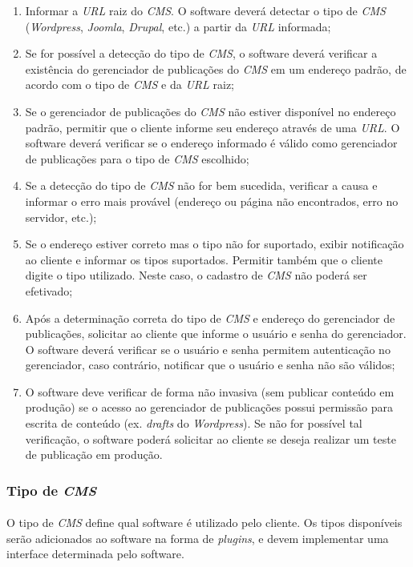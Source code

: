 \documentclass[a4paper,12pt]{article}
\def\cms{\emph{CMS}}
\def\url{\emph{URL}}
\begin{document}
\begin{enumerate}
\item Informar a \url{} raiz do \cms{}. O software deverá detectar o tipo de
\cms{} (\emph{Wordpress}, \emph{Joomla}, \emph{Drupal}, etc.) a partir da
\url{} informada;
\item Se for possível a detecção do tipo de \cms{}, o software deverá verificar
a existência do gerenciador de publicações do \cms{} em um endereço padrão, de
acordo com o tipo de \cms{} e da \url{} raiz;
\item Se o gerenciador de publicações do \cms{} não estiver disponível no
endereço padrão, permitir que o cliente informe seu endereço através de uma
\url{}. O software deverá verificar se o endereço informado é válido como
gerenciador de publicações para o tipo de \cms{} escolhido;
\item Se a detecção do tipo de \cms{} não for bem sucedida, verificar a causa e
informar o erro mais provável (endereço ou página não encontrados, erro no
servidor, etc.);
\item Se o endereço estiver correto mas o tipo não for suportado, exibir
notificação ao cliente e informar os tipos suportados. Permitir também que o
cliente digite o tipo utilizado. Neste caso, o cadastro de \cms{} não poderá
ser efetivado;
\item Após a determinação correta do tipo de \cms{} e endereço do gerenciador
de publicações, solicitar ao cliente que informe o usuário e senha do
gerenciador. O software deverá verificar se o usuário e senha permitem
autenticação no gerenciador, caso contrário, notificar que o usuário e senha
não são válidos;
\item O software deve verificar de forma não invasiva (sem publicar conteúdo em
produção) se o acesso ao gerenciador de publicações possui permissão para
escrita de conteúdo (ex. \emph{drafts} do \emph{Wordpress}). Se não for
possível tal verificação, o software poderá solicitar ao cliente se deseja
realizar um teste de publicação em produção.
\end{enumerate}

\subsubsection{Tipo de \cms{}}

\paragraph{}
O tipo de \cms{} define qual software é utilizado pelo cliente. Os tipos
disponíveis serão adicionados ao software na forma de \emph{plugins}, e devem
implementar uma interface determinada pelo software.
\end{document}
